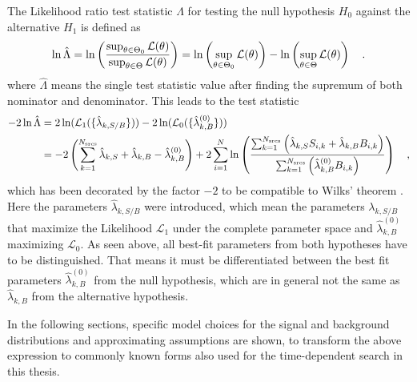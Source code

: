 The Likelihood ratio test statistic $\Lambda$ for testing the null hypothesis $H_0$ against the alternative $H_1$ is defined as 
\begin{equation}
  \ln\hat{\Lambda}
  = \ln\left(\frac{\sup_{\theta \in \Theta_0} \mathcal{L}(\theta)}
                  {\sup_{\theta \in \Theta} \mathcal{L}(\theta)}\right)
  = \ln\left(\sup_{\theta \in \Theta_0} \mathcal{L}(\theta)\right) -
    \ln\left(\sup_{\theta \in \Theta} \mathcal{L}(\theta)\right)
  \quad\text{.}
\end{equation}
where $\hat{\Lambda}$ means the single test statistic value after finding the supremum of both nominator and denominator.
This leads to the test statistic
\begin{equation}
  \begin{aligned}
    -2\ln\hat{\Lambda}
    &= 2\ln(\mathcal{L}_1(\{\hat{\lambda}_{k,S/B}\})) -
       2\ln(\mathcal{L}_0(\{\hat{\lambda}^{(0)}_{k,B}\})) \\
    &= -2\left(\sum_{k=1}^{N_\text{srcs}}\hat{\lambda}_{k,S} +
                                         \hat{\lambda}_{k,B} -
                                         \hat{\lambda}_{k,B}^{(0)}\right) +
      2\sum_{i=1}^N \ln\left(
        \frac{\sum_{k=1}^{N_\text{srcs}}\left(
            \hat{\lambda}_{k,S} S_{i,k}+\hat{\lambda}_{k,B} B_{i,k}\right)}
            {\sum_{k=1}^{N_\text{srcs}}\left(
              \hat{\lambda}_{k,B}^{(0)} B_{i,k}
            \right)}
          \right)
    \quad\text{,}
  \end{aligned}
\end{equation}
which has been decorated by the factor $-2$ to be compatible to Wilks' theorem .
Here the parameters $\hat{\lambda}_{k,S/B}$ were introduced, which mean the parameters $\lambda_{k,S/B}$ that maximize the Likelihood $\mathcal{L}_1$ under the complete parameter space and $\hat{\lambda}_{k,B}^{(0)}$ maximizing $\mathcal{L}_0$.
As seen above, all best-fit parameters from both hypotheses have to be distinguished.
That means it must be differentiated between the best fit parameters $\hat{\lambda}_{k,B}^{(0)}$ from the null hypothesis, which are in general not the same as $\hat{\lambda}_{k,B}$ from the alternative hypothesis.

In the following sections, specific model choices for the signal and background distributions and approximating assumptions are shown, to transform the above expression to commonly known forms also used for the time-dependent search in this thesis.


